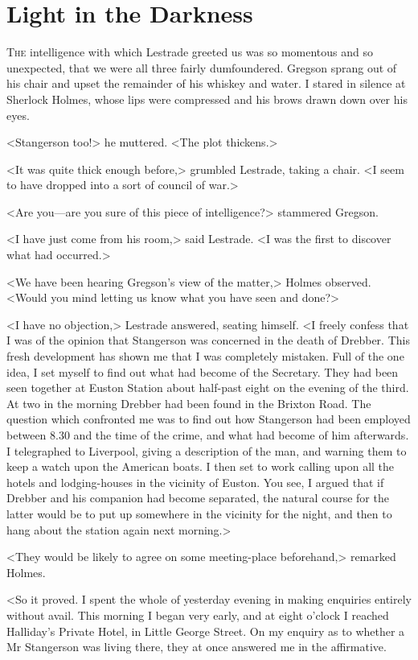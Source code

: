 \chapter{Light in the Darkness}
\lettrine{T}{he} intelligence with which Lestrade greeted us was so momentous and so unexpected, that we were all three fairly dumfoundered. Gregson sprang out of his chair and upset the remainder of his whiskey and water. I stared in silence at Sherlock Holmes, whose lips were compressed and his brows drawn down over his eyes.

<Stangerson too!> he muttered. <The plot thickens.>

<It was quite thick enough before,> grumbled Lestrade, taking a chair. <I seem to have dropped into a sort of council of war.>

<Are you—are you sure of this piece of intelligence?> stammered Gregson.

<I have just come from his room,> said Lestrade. <I was the first to discover what had occurred.>

<We have been hearing Gregson's view of the matter,> Holmes observed. <Would you mind letting us know what you have seen and done?>

<I have no objection,> Lestrade answered, seating himself. <I freely confess that I was of the opinion that Stangerson was concerned in the death of Drebber. This fresh development has shown me that I was completely mistaken. Full of the one idea, I set myself to find out what had become of the Secretary. They had been seen together at Euston Station about half-past eight on the evening of the third. At two in the morning Drebber had been found in the Brixton Road. The question which confronted me was to find out how Stangerson had been employed between 8.30 and the time of the crime, and what had become of him afterwards. I telegraphed to Liverpool, giving a description of the man, and warning them to keep a watch upon the American boats. I then set to work calling upon all the hotels and lodging-houses in the vicinity of Euston. You see, I argued that if Drebber and his companion had become separated, the natural course for the latter would be to put up somewhere in the vicinity for the night, and then to hang about the station again next morning.>

<They would be likely to agree on some meeting-place beforehand,> remarked Holmes.

<So it proved. I spent the whole of yesterday evening in making enquiries entirely without avail. This morning I began very early, and at eight o'clock I reached Halliday's Private Hotel, in Little George Street. On my enquiry as to whether a Mr Stangerson was living there, they at once answered me in the affirmative.

